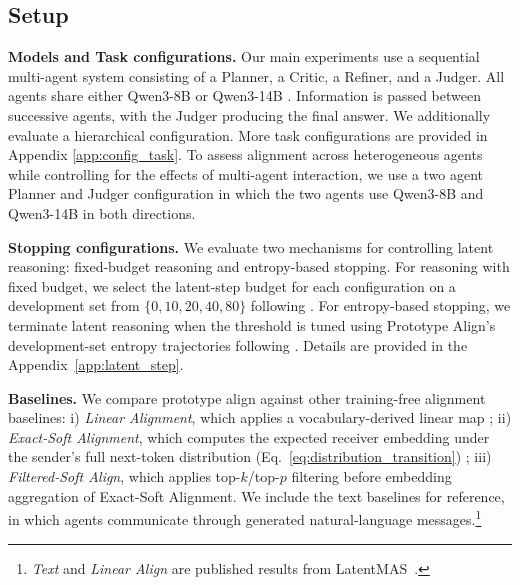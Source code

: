 \documentclass[11pt]{article}
\begin{document}
\subsection{Setup}
\textbf{Models and Task configurations.} Our main experiments use a sequential multi-agent system consisting of a Planner, a Critic, a Refiner, and a Judger. All agents share either Qwen3-8B or Qwen3-14B \citep{qwen3}. Information is passed between successive agents, with the Judger producing the final answer. We additionally evaluate a hierarchical configuration. More task configurations are provided in Appendix \ref{app:config_task}.
To assess alignment across heterogeneous agents while controlling for the effects of multi-agent interaction, we use a two agent Planner and Judger configuration in which the two agents use Qwen3-8B and Qwen3-14B in both directions. 

\noindent\textbf{Stopping configurations.}
We evaluate two mechanisms for controlling latent reasoning: fixed-budget reasoning and entropy-based stopping. For reasoning with fixed budget, we select the latent-step budget for each configuration on a development set from $\{0,10,20,40,80\}$ following \citet{latentmas}. For entropy-based stopping, we terminate latent reasoning when the threshold is tuned using Prototype Align's development-set entropy trajectories following \citep{soft_thinking}. Details are provided in the Appendix~\ref{app:latent_step}. 

\noindent\textbf{Baselines.}
We compare prototype align against other training-free alignment baselines:
i) \emph{Linear Alignment}, which applies a vocabulary-derived linear map \citep{latentmas};
ii) \emph{Exact-Soft Alignment}, which computes the expected receiver embedding under the sender's full next-token distribution (Eq.~\ref{eq:distribution_transition}) \citep{soft_thinking}; iii) \emph{Filtered-Soft Align}, which applies top-$k$/top-$p$ filtering before embedding aggregation of Exact-Soft Alignment.
We include the text baselines for reference, in which agents communicate through generated natural-language messages.\footnote{\textit{Text} and \textit{Linear Align} are published results from LatentMAS~\citep{latentmas}. 
}
\end{document}

